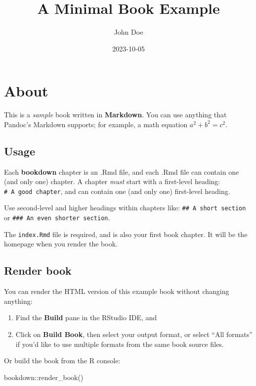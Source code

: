 \documentclass[
]{book}
\title{A Minimal Book Example}
\author{John Doe}
\date{2023-10-05}
\newenvironment{Shaded}{\begin{snugshade}}{\end{snugshade}}
\newcommand{\FunctionTok}[1]{\textcolor[rgb]{0.00,0.00,0.00}{#1}}
\newcommand{\NormalTok}[1]{#1}
\newcommand{\SpecialCharTok}[1]{\textcolor[rgb]{0.00,0.00,0.00}{#1}}
\begin{document}
\maketitle

{
\setcounter{tocdepth}{1}
\tableofcontents
}
\hypertarget{about}{%
\chapter{About}\label{about}}

This is a \emph{sample} book written in \textbf{Markdown}. You can use anything that Pandoc's Markdown supports; for example, a math equation \(a^2 + b^2 = c^2\).

\hypertarget{usage}{%
\section{Usage}\label{usage}}

Each \textbf{bookdown} chapter is an .Rmd file, and each .Rmd file can contain one (and only one) chapter. A chapter \emph{must} start with a first-level heading: \texttt{\#\ A\ good\ chapter}, and can contain one (and only one) first-level heading.

Use second-level and higher headings within chapters like: \texttt{\#\#\ A\ short\ section} or \texttt{\#\#\#\ An\ even\ shorter\ section}.

The \texttt{index.Rmd} file is required, and is also your first book chapter. It will be the homepage when you render the book.

\hypertarget{render-book}{%
\section{Render book}\label{render-book}}

You can render the HTML version of this example book without changing anything:

\begin{enumerate}
\def\labelenumi{\arabic{enumi}.}
\item
  Find the \textbf{Build} pane in the RStudio IDE, and
\item
  Click on \textbf{Build Book}, then select your output format, or select ``All formats'' if you'd like to use multiple formats from the same book source files.
\end{enumerate}

Or build the book from the R console:

\begin{Shaded}
\begin{Highlighting}[]
\NormalTok{bookdown}\SpecialCharTok{::}\FunctionTok{render\_book}\NormalTok{()}
\end{Highlighting}
\end{Shaded}
\end{document}
